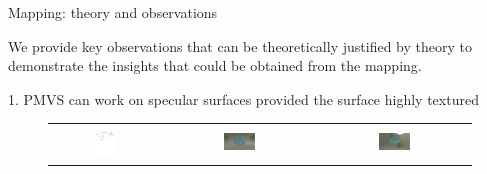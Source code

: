 \documentclass[10pt]{beamer}
\begin{document}
\begin{frame}{Mapping: theory and observations}

We provide key observations that can be theoretically justified by theory to demonstrate the insights that could be obtained from the mapping.

\begin{exampleblock}{1. PMVS can work on specular surfaces provided the surface highly textured}
\begin{figure}
\begin{tabular}{ccc}
\includegraphics[width=0.22\textwidth]{mapping/mvs_spec/mvs_spec}&
\includegraphics[width=0.22\textwidth]{mapping/mvs_spec/mvs_spec_01}&
\includegraphics[width=0.22\textwidth]{mapping/mvs_spec/mvs_spec_00}\\
\end{tabular}
\end{figure}
\end{exampleblock}


\end{frame}
\end{document}
